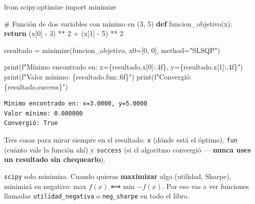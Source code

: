 \documentclass[
  spanish,
  letterpaper,
  DIV=11,
  numbers=noendperiod]{scrreprt}
\newenvironment{Shaded}{\begin{snugshade}}{\end{snugshade}}
\newcommand{\BuiltInTok}[1]{\textcolor[rgb]{0.00,0.23,0.31}{#1}}
\newcommand{\CommentTok}[1]{\textcolor[rgb]{0.37,0.37,0.37}{#1}}
\newcommand{\ControlFlowTok}[1]{\textcolor[rgb]{0.00,0.23,0.31}{\textbf{#1}}}
\newcommand{\DecValTok}[1]{\textcolor[rgb]{0.68,0.00,0.00}{#1}}
\newcommand{\ImportTok}[1]{\textcolor[rgb]{0.00,0.46,0.62}{#1}}
\newcommand{\KeywordTok}[1]{\textcolor[rgb]{0.00,0.23,0.31}{\textbf{#1}}}
\newcommand{\NormalTok}[1]{\textcolor[rgb]{0.00,0.23,0.31}{#1}}
\newcommand{\OperatorTok}[1]{\textcolor[rgb]{0.37,0.37,0.37}{#1}}
\newcommand{\SpecialCharTok}[1]{\textcolor[rgb]{0.37,0.37,0.37}{#1}}
\newcommand{\SpecialStringTok}[1]{\textcolor[rgb]{0.13,0.47,0.30}{#1}}
\newcommand{\StringTok}[1]{\textcolor[rgb]{0.13,0.47,0.30}{#1}}
\begin{document}
\label{minimize-basico}
\begin{Shaded}
\begin{Highlighting}[]
\ImportTok{from}\NormalTok{ scipy.optimize }\ImportTok{import}\NormalTok{ minimize}

\CommentTok{\# Función de dos variables con mínimo en (3, 5)}
\KeywordTok{def}\NormalTok{ funcion\_objetivo(x):}
    \ControlFlowTok{return}\NormalTok{ (x[}\DecValTok{0}\NormalTok{] }\OperatorTok{{-}} \DecValTok{3}\NormalTok{) }\OperatorTok{**} \DecValTok{2} \OperatorTok{+}\NormalTok{ (x[}\DecValTok{1}\NormalTok{] }\OperatorTok{{-}} \DecValTok{5}\NormalTok{) }\OperatorTok{**} \DecValTok{2}

\NormalTok{resultado }\OperatorTok{=}\NormalTok{ minimize(funcion\_objetivo, x0}\OperatorTok{=}\NormalTok{[}\DecValTok{0}\NormalTok{, }\DecValTok{0}\NormalTok{], method}\OperatorTok{=}\StringTok{"SLSQP"}\NormalTok{)}

\BuiltInTok{print}\NormalTok{(}\SpecialStringTok{f"Mínimo encontrado en: x=}\SpecialCharTok{\{}\NormalTok{resultado}\SpecialCharTok{.}\NormalTok{x[}\DecValTok{0}\NormalTok{]}\SpecialCharTok{:.4f\}}\SpecialStringTok{, y=}\SpecialCharTok{\{}\NormalTok{resultado}\SpecialCharTok{.}\NormalTok{x[}\DecValTok{1}\NormalTok{]}\SpecialCharTok{:.4f\}}\SpecialStringTok{"}\NormalTok{)}
\BuiltInTok{print}\NormalTok{(}\SpecialStringTok{f"Valor mínimo: }\SpecialCharTok{\{}\NormalTok{resultado}\SpecialCharTok{.}\NormalTok{fun}\SpecialCharTok{:.6f\}}\SpecialStringTok{"}\NormalTok{)}
\BuiltInTok{print}\NormalTok{(}\SpecialStringTok{f"Convergió: }\SpecialCharTok{\{}\NormalTok{resultado}\SpecialCharTok{.}\NormalTok{success}\SpecialCharTok{\}}\SpecialStringTok{"}\NormalTok{)}
\end{Highlighting}
\end{Shaded}

\begin{verbatim}
Mínimo encontrado en: x=3.0000, y=5.0000
Valor mínimo: 0.000000
Convergió: True
\end{verbatim}

Tres cosas para mirar siempre en el resultado: \texttt{x} (dónde está el
óptimo), \texttt{fun} (cuánto vale la función ahí) y \texttt{success}
(si el algoritmo convergió --- \textbf{nunca uses un resultado sin
chequearlo}).

\begin{tcolorbox}[enhanced jigsaw, bottomrule=.15mm, colback=white, opacitybacktitle=0.6, arc=.35mm, toprule=.15mm, opacityback=0, breakable, titlerule=0mm, left=2mm, coltitle=black, colbacktitle=quarto-callout-tip-color!10!white, colframe=quarto-callout-tip-color-frame, leftrule=.75mm, toptitle=1mm, bottomtitle=1mm, title=\textcolor{quarto-callout-tip-color}{\faLightbulb}\hspace{0.5em}{Maximizar = minimizar el negativo}, rightrule=.15mm]

\texttt{scipy} solo minimiza. Cuando quieras \textbf{maximizar} algo
(utilidad, Sharpe), minimizá su negativo: max \(f(x)\) ⟺ min \(-f(x)\).
Por eso vas a ver funciones llamadas \texttt{utilidad\_negativa} o
\texttt{neg\_sharpe} en todo el libro.

\end{tcolorbox}
\end{document}
